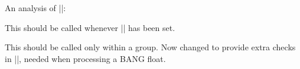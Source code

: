 \begin{macro}{\@endfloatbox}
\begin{teX}
  \begin{macro}{\@dbflt}
  \begin{macro}{\@xdblfloat}
    \begin{teX}
\def\@dbflt#1{\@ifnextchar[{\@xdblfloat{#1}}{\@xdblfloat{#1}[tp]}}
\def\@xdblfloat#1[#2]{%
  \@xfloat{#1}[#2]\hsize\textwidth\linewidth\textwidth}
    \end{teX}
  \end{macro}
  \end{macro}

    \begin{teX}
\newcount\c@topnumber
\newcount\c@dbltopnumber
\newcount\c@bottomnumber
\newcount\c@totalnumber
    \end{teX}

 An analysis of |\@floatplacement|:

 This should be called whenever |\@colht| has been set.
    \begin{teX}
\def\@floatplacement{\global\@topnum\c@topnumber
   \global\@toproom \topfraction\@colht
   \global\@botnum  \c@bottomnumber
   \global\@botroom \bottomfraction\@colht
   \global\@colnum  \c@totalnumber
   \@fpmin   \floatpagefraction\@colht}
    \end{teX}

  \begin{macro}{\@dblfloatplacement}
 
     This should be called only within a group.  Now changed to
     provide extra checks in |\@addtodblcol|, needed when processing a
     BANG float.
    
    \begin{teX}  
\def \@dblfloatplacement {%
    \end{teX}
    Textpage bit: global, but need not be.
    \begin{teX}  
  \global \@dbltopnum \c@dbltopnumber
  \global \@dbltoproom \dbltopfraction\@colht
    \end{teX}
   This new bit uses |\@textmin| to locally store the amount of extra
   room in the column.   
    \begin{teX}
  \@textmin \@colht
  \advance \@textmin -\@dbltoproom
    \end{teX}
    Floatpage bit: must be local.
    \begin{teX}
  \@fpmin \dblfloatpagefraction\textheight
  \@fptop \@dblfptop
  \@fpsep \@dblfpsep
  \@fpbot \@dblfpbot
}
    \end{teX}
  \end{macro}


\end{teX}
\end{macro}
